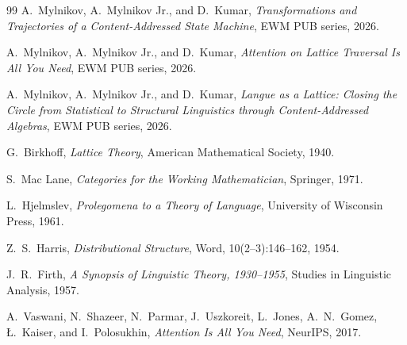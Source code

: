 \documentclass[11pt,a4paper]{article}
\theoremstyle{remark}
\begin{document}
\begin{thebibliography}{99}
 A.~Mylnikov, A.~Mylnikov Jr., and D.~Kumar,
\textit{Transformations and Trajectories of a Content-Addressed State
Machine}, EWM PUB series, 2026.

 A.~Mylnikov, A.~Mylnikov Jr., and D.~Kumar,
\textit{Attention on Lattice Traversal Is All You Need}, EWM PUB series, 2026.

 A.~Mylnikov, A.~Mylnikov Jr., and D.~Kumar,
\textit{Langue as a Lattice: Closing the Circle from Statistical to
Structural Linguistics through Content-Addressed Algebras}, EWM PUB series,
2026.

 G.~Birkhoff,
\textit{Lattice Theory}, American Mathematical Society, 1940.

 S.~Mac Lane,
\textit{Categories for the Working Mathematician}, Springer, 1971.

 L.~Hjelmslev,
\textit{Prolegomena to a Theory of Language}, University of Wisconsin Press,
1961.

 Z.~S.~Harris,
\textit{Distributional Structure}, Word, 10(2--3):146--162, 1954.

 J.~R.~Firth,
\textit{A Synopsis of Linguistic Theory, 1930--1955}, Studies in Linguistic
Analysis, 1957.

 A.~Vaswani, N.~Shazeer, N.~Parmar, J.~Uszkoreit,
L.~Jones, A.~N.~Gomez, \L.~Kaiser, and I.~Polosukhin,
\textit{Attention Is All You Need}, NeurIPS, 2017.

\end{thebibliography}
\end{document}
